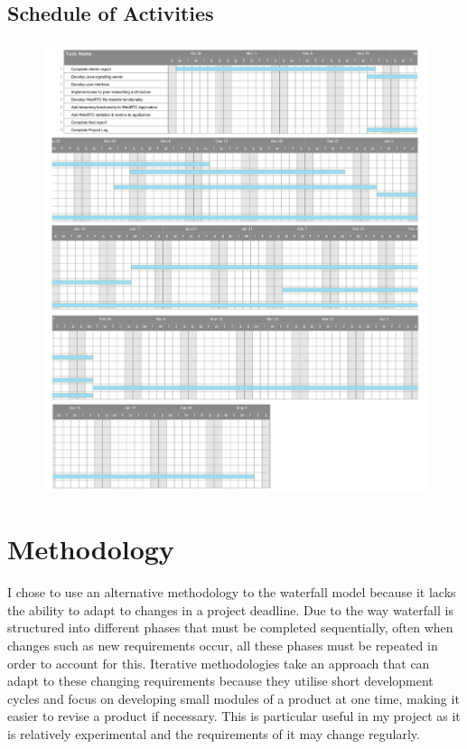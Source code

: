 \documentclass[]{report}
\begin{document}
			\subsection*{Schedule of Activities}
				\begin{figure}[h!]
					\includegraphics[scale=0.5]{ganttchart.png}
				\end{figure}
			\newpage	
			
	\section{Methodology}
		I chose to use an alternative methodology to the waterfall model because it lacks the ability to adapt to changes in a project deadline. Due to the way waterfall is structured into different phases that must be completed sequentially, often when changes such as new requirements occur, all these phases must be repeated in order to account for this. Iterative methodologies take an approach that can adapt to these changing requirements because they utilise short development cycles and focus on developing small modules of a product at one time, making it easier to revise a product if necessary. This is particular useful in my project as it is relatively experimental and the requirements of it may change regularly. 
		
\end{document}
